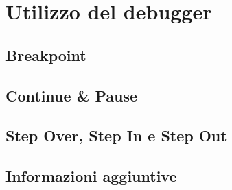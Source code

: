 \chapter{Utilizzo del debugger}
\section{Breakpoint}
\section{Continue & Pause}
\section{Step Over, Step In e Step Out}
\section{Informazioni aggiuntive}
